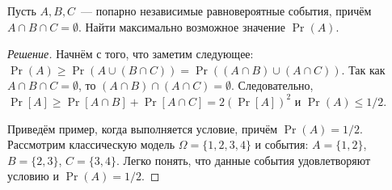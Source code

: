 \begin{problem}
    Пусть \(A, B, C\)~--- попарно независимые равновероятные события, причём \(A \cap B \cap C = \emptyset\). Найти максимально возможное значение \(\Pr(A)\).
\end{problem}
\begin{proof}[Решение]
    Начнём с того, что заметим следующее: \(\Pr(A) \geq \Pr(A \cup (B \cap C)) = \Pr((A \cap B) \cup (A \cap C))\). Так как \(A \cap B \cap C = \emptyset\), то \((A \cap B) \cap (A \cap C) = \emptyset\). Следовательно, \(\Pr[A] \geq \Pr[A \cap B] + \Pr[A \cap C] = 2(\Pr[A])^2\) и \(\Pr(A) \leq 1/2\).
    
    Приведём пример, когда выполняется условие, причём \(\Pr(A) = 1/2\). Рассмотрим классическую модель \(\Omega = \{1, 2, 3, 4\}\) и события: \(A = \{1, 2\}\), \(B = \{2, 3\}\), \(C = \{3, 4\}\). Легко понять, что данные события удовлетворяют условию и \(\Pr(A) = 1/2\).
\end{proof}

